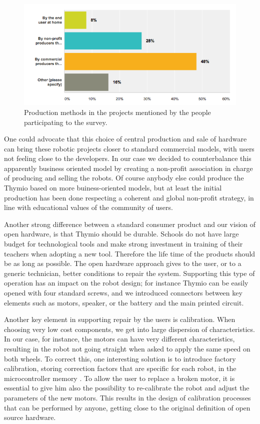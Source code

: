 \documentclass[letterpaper, 10 pt, conference]{ieeeconf}  %
\begin{document}
\begin{figure}
\centering
\includegraphics[width=\columnwidth]{figures/production}
\caption{Production methods in the projects mentioned by the people participating to the survey.}
\label{fig:production}
\end{figure}


One could advocate that this choice of central production and sale of hardware can bring these robotic projects closer to standard commercial models, with users not feeling close to the developers.
In our case we decided to counterbalance this apparently business oriented model by creating a non-profit association in charge of producing and selling the robots. 
Of course anybody else could produce the Thymio based on more buiness-oriented models, but at least the initial production has been done respecting a coherent and global non-profit strategy, in line with educational values of the community of users.

Another strong difference between a standard consumer product and our vision of open hardware, is that Thymio should be durable.
Schools do not have large budget for technological tools and make strong investment in training of their teachers when adopting a new tool.
Therefore the life time of the products should be as long as possible. 
The open hardware approach gives to the user, or to a generic technician, better conditions to repair the system.
Supporting this type of operation has an impact on the robot design; for instance Thymio can be easily opened with four standard screws, and we introduced connectors between key elements such as motors, speaker, or the battery and the main printed circuit. 

Another key element in supporting repair by the users is calibration. 
When choosing very low cost components, we get into large dispersion of characteristics. 
In our case, for instance, the motors can have very different characteristics, resulting in the robot not going straight when asked to apply the same speed on both wheels. 
To correct this, one interesting solution is to introduce factory calibration, storing correction factors that are specific for each robot, in the microcontroller memory . 
To allow the user to replace a broken motor, it is essential to give him also the possibility to re-calibrate the robot and adjust the parameters of the new motors.
This results in the design of calibration processes that can be performed by anyone, getting close to the original definition of open source hardware.
\end{document}
